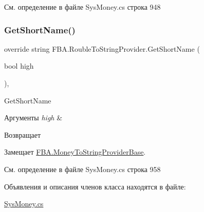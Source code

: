 См. определение в файле Sys\+Money.\+cs строка 948

\mbox{\label{class_f_b_a_1_1_rouble_to_string_provider_ab07e18dc82b66cbd58a7bcbd4a049c5f}} 
\subsubsection{\texorpdfstring{Get\+Short\+Name()}{GetShortName()}}
{\footnotesize\ttfamily override string F\+B\+A.\+Rouble\+To\+String\+Provider.\+Get\+Short\+Name (\begin{DoxyParamCaption}\item[{bool}]{high }\end{DoxyParamCaption})\hspace{0.3cm}{\ttfamily [protected]}, {\ttfamily [virtual]}}



Get\+Short\+Name 


\begin{DoxyParams}{Аргументы}
{\em high} & \\
\hline
\end{DoxyParams}
\begin{DoxyReturn}{Возвращает}

\end{DoxyReturn}


Замещает \mbox{\hyperlink{class_f_b_a_1_1_money_to_string_provider_base_a88f493205be3da3950e2175f1e033595}{F\+B\+A.\+Money\+To\+String\+Provider\+Base}}.



См. определение в файле Sys\+Money.\+cs строка 958



Объявления и описания членов класса находятся в файле\+:\begin{DoxyCompactItemize}
\item 
\mbox{\hyperlink{_sys_money_8cs}{Sys\+Money.\+cs}}\end{DoxyCompactItemize}
